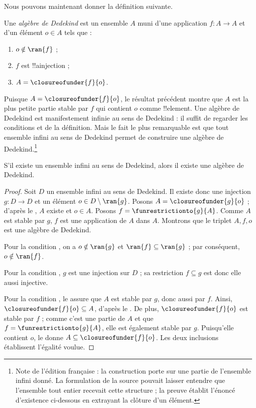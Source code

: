 \documentclass[11pt,a4paper,openany]{memoir}
\begin{document}
Nous pouvons maintenant donner la définition suivante.

\begin{defn}
Une \emph{algèbre de Dedekind} est un ensemble $A$ muni d'une application
$f\colon A\to A$ et d'un élément $o\in A$ tels que :
	\begin{enumerate}
		\item {} $o \notin \ran{f}$ ;
		\item {} $f$ est !!a{injection} ;
		\item {} $A = \closureofunder{f}{o}$.
	\end{enumerate}
\end{defn}

Puisque $A = \closureofunder{f}{o}$, le résultat précédent montre que
$A$ est la plus petite partie stable par $f$ qui contient $o$ comme
!!{element}. Une algèbre de Dedekind est manifestement infinie au sens
de Dedekind : il suffit de regarder les conditions 
et  de la définition. Mais le fait le plus
remarquable est que tout ensemble infini au sens de Dedekind permet de
construire une algèbre de Dedekind.\footnote{Note de l'édition française :
la construction porte sur une partie de l'ensemble infini donné.
La formulation de la source pouvait laisser entendre que l'ensemble
tout entier recevait cette structure ; la preuve établit l'énoncé
d'existence ci-dessous en extrayant la clôture d'un élément.}

\begin{thm}
S'il existe un ensemble infini au sens de Dedekind, alors il existe une
algèbre de Dedekind.
\end{thm}

\begin{proof}
Soit $D$ un ensemble infini au sens de Dedekind. Il existe donc une
injection $g\colon D\to D$ et un élément $o\in D\setminus\ran{g}$.
Posons $A = \closureofunder{g}{o}$ ; d'après le
, $A$ existe et $o \in A$.
Posons $f = \funrestrictionto{g}{A}$. Comme $A$ est stable par $g$,
$f$ est une application de $A$ dans $A$. Montrons que le triplet
$A,f,o$ est une algèbre de Dedekind.

Pour la condition , on a $o \notin \ran{g}$ et
$\ran{f} \subseteq \ran{g}$ ; par conséquent, $o\notin\ran{f}$.

Pour la condition , $g$ est une injection sur $D$ ;
sa restriction $f \subseteq g$ est donc elle aussi injective.

Pour la condition , le
 assure que $A$ est stable par $g$, donc
aussi par $f$. Ainsi, $\closureofunder{f}{o}\subseteq A$, d'après le
. De plus, $\closureofunder{f}{o}$ est stable
par $f$ ; comme c'est une partie de $A$ et que
$f = \funrestrictionto{g}{A}$, elle est également stable par $g$.
Puisqu'elle contient $o$, le  donne
$A\subseteq\closureofunder{f}{o}$. Les deux inclusions établissent
l'égalité voulue.
\end{proof}
\end{document}
